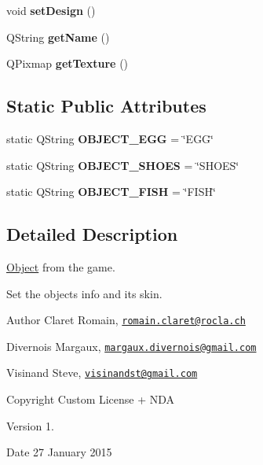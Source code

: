 \begin{DoxyCompactItemize}
\item 
\hypertarget{class_object_a64d92ae18b1e70a8435690fe6fccf1fd}{}void {\bfseries set\+Design} ()\label{class_object_a64d92ae18b1e70a8435690fe6fccf1fd}

\item 
\hypertarget{class_object_a13fe059222e66ea54aa3f6f8615a3d72}{}Q\+String {\bfseries get\+Name} ()\label{class_object_a13fe059222e66ea54aa3f6f8615a3d72}

\item 
\hypertarget{class_object_a2678fa7a8ab432607b228e8d311f2873}{}Q\+Pixmap {\bfseries get\+Texture} ()\label{class_object_a2678fa7a8ab432607b228e8d311f2873}

\end{DoxyCompactItemize}
\subsection*{Static Public Attributes}
\begin{DoxyCompactItemize}
\item 
\hypertarget{class_object_a0a972ddd5ddbc92ba7511d53c2322e87}{}static Q\+String {\bfseries O\+B\+J\+E\+C\+T\+\_\+\+E\+G\+G} = \char`\"{}E\+G\+G\char`\"{}\label{class_object_a0a972ddd5ddbc92ba7511d53c2322e87}

\item 
\hypertarget{class_object_ac5fa0707cf18da4b3dd6524272669ed6}{}static Q\+String {\bfseries O\+B\+J\+E\+C\+T\+\_\+\+S\+H\+O\+E\+S} = \char`\"{}S\+H\+O\+E\+S\char`\"{}\label{class_object_ac5fa0707cf18da4b3dd6524272669ed6}

\item 
\hypertarget{class_object_acb02186f26eea4084c39d7092ec4e8e5}{}static Q\+String {\bfseries O\+B\+J\+E\+C\+T\+\_\+\+F\+I\+S\+H} = \char`\"{}F\+I\+S\+H\char`\"{}\label{class_object_acb02186f26eea4084c39d7092ec4e8e5}

\end{DoxyCompactItemize}


\subsection{Detailed Description}
\hyperlink{class_object}{Object} from the game. 

Set the object\textquotesingle{}s info and its skin. \begin{DoxyAuthor}{Author}
Claret Romain, \href{mailto:romain.claret@rocla.ch}{\tt romain.\+claret@rocla.\+ch} 

Divernois Margaux, \href{mailto:margaux.divernois@gmail.com}{\tt margaux.\+divernois@gmail.\+com} 

Visinand Steve, \href{mailto:visinandst@gmail.com}{\tt visinandst@gmail.\+com} 
\end{DoxyAuthor}
\begin{DoxyCopyright}{Copyright}
Custom License + N\+D\+A 
\end{DoxyCopyright}
\begin{DoxyVersion}{Version}
1. 
\end{DoxyVersion}
\begin{DoxyDate}{Date}
27 January 2015 
\end{DoxyDate}


